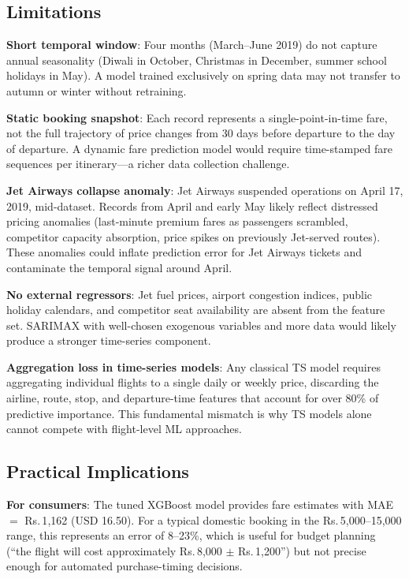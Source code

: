 \documentclass[12pt, a4paper]{article}
\begin{document}
\subsection{Limitations}

\textbf{Short temporal window}: Four months (March--June 2019) do not capture
annual seasonality (Diwali in October, Christmas in December, summer school
holidays in May).  A model trained exclusively on spring data may not transfer
to autumn or winter without retraining.

\textbf{Static booking snapshot}: Each record represents a single-point-in-time
fare, not the full trajectory of price changes from 30 days before departure
to the day of departure.  A dynamic fare prediction model would require
time-stamped fare sequences per itinerary---a richer data collection challenge.

\textbf{Jet Airways collapse anomaly}: Jet Airways suspended operations on
April 17, 2019, mid-dataset.  Records from April and early May likely reflect
distressed pricing anomalies (last-minute premium fares as passengers scrambled,
competitor capacity absorption, price spikes on previously Jet-served routes).
These anomalies could inflate prediction error for Jet Airways tickets and
contaminate the temporal signal around April.

\textbf{No external regressors}: Jet fuel prices, airport congestion indices,
public holiday calendars, and competitor seat availability are absent from the
feature set.  SARIMAX with well-chosen exogenous variables and more data would
likely produce a stronger time-series component.

\textbf{Aggregation loss in time-series models}: Any classical TS model
requires aggregating individual flights to a single daily or weekly price,
discarding the airline, route, stop, and departure-time features that account
for over 80\% of predictive importance.  This fundamental mismatch is why
TS models alone cannot compete with flight-level ML approaches.

\subsection{Practical Implications}

\textbf{For consumers}: The tuned XGBoost model provides fare estimates
with MAE $=$ Rs.\,1{,}162 (USD 16.50).  For a typical domestic booking
in the Rs.\,5{,}000--15{,}000 range, this represents an error of 8--23\%,
which is useful for budget planning (``the flight will cost approximately
Rs.\,8{,}000 $\pm$ Rs.\,1{,}200'') but not precise enough for automated
purchase-timing decisions.
\end{document}
